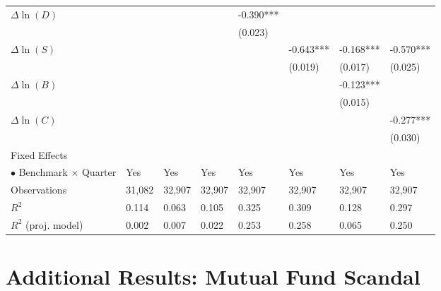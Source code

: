 \documentclass[openany]{book}
\theoremstyle{definition}
\theoremstyle{definition}
\theoremstyle{definition}
\theoremstyle{remark}
\begin{document}
\begin{table}[ht]
\begin{tabularx}{0.975\textwidth}{lYYYYYYY}
  $\Delta\ln(D)$ &  &  &  & -0.390*** &  &  &  \\ 
   &  &  &  & (0.023) &  &  &  \\ 
  $\Delta\ln(S)$ &  &  &  &  & -0.643*** & -0.168*** & -0.570*** \\ 
   &  &  &  &  & (0.019) & (0.017) & (0.025) \\ 
  $\Delta\ln(B)$ &  &  &  &  &  & -0.123*** &  \\ 
   &  &  &  &  &  & (0.015) &  \\ 
  $\Delta\ln(C)$ &  &  &  &  &  &  & -0.277*** \\ 
   &  &  &  &  &  &  & (0.030) \\ 
  Fixed Effects &  &  &  &  &  &  &  \\ 
  $\bullet$ Benchmark $\times$ Quarter & Yes & Yes & Yes & Yes & Yes & Yes & Yes \\ 
  Observations & 31,082 & 32,907 & 32,907 & 32,907 & 32,907 & 32,907 & 32,907 \\ 
  $R^2$ & 0.114 & 0.063 & 0.105 & 0.325 & 0.309 & 0.128 & 0.297 \\ 
  $R^2$ (proj. model) & 0.002 & 0.007 & 0.022 & 0.253 & 0.258 & 0.065 & 0.250 \\ 
   \bottomrule
\end{tabularx}
\endgroup
\end{table}

\chapter{Additional Results: Mutual Fund
Scandal}\label{additional-results-mutual-fund-scandal}
\end{document}

